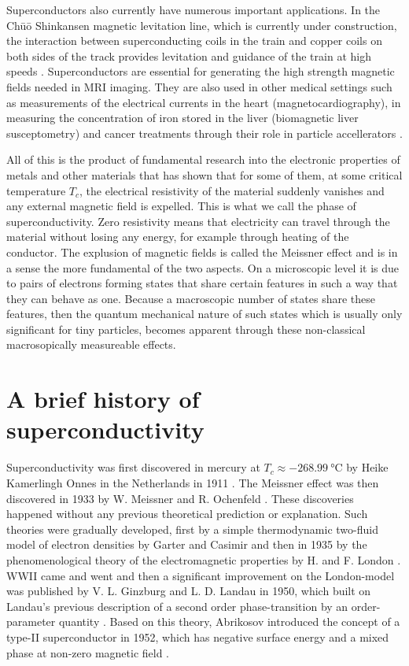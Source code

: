 Superconductors also currently have numerous important applications. In the Ch\=u\=o Shinkansen magnetic levitation line, which is currently
under construction, the interaction between superconducting coils in the train and copper coils on both sides of the track provides levitation and
guidance of the train at high speeds \cite{Bernstein20}. Superconductors are essential for generating the high strength magnetic fields needed
in MRI imaging. They are also used in other medical settings such as measurements of the electrical currents in the heart (magnetocardiography),
in measuring the concentration of iron stored in the liver (biomagnetic liver susceptometry) and cancer treatments through their role in 
particle accellerators \cite{Alonso12}.

All of this is the product of fundamental research into the electronic properties of metals and other materials that has shown that for some
of them, at some critical temperature $T_c$, the electrical resistivity of the material suddenly vanishes and any external magnetic field is expelled. This
is what we call the phase of superconductivity. Zero resistivity means that electricity can travel through the material without losing any energy, for
example through heating of the conductor. The explusion of magnetic fields is called the Meissner effect and is in a sense the more fundamental
of the two aspects. On a microscopic level it is due to pairs of electrons forming states that share certain features in such a way that they
can behave as one. Because a macroscopic number of states share these features, then the quantum mechanical nature of such states which is usually
only significant for tiny particles, becomes apparent through these non-classical macrosopically measureable effects.


\section{A brief history of superconductivity}

Superconductivity was first discovered in mercury at $T_c\approx\SI{-268.99}{\degreeCelsius}$ by Heike Kamerlingh Onnes in the Netherlands in 1911 \cite{Onnes}.
The Meissner effect was then discovered in 1933 by W. Meissner and R. Ochenfeld \cite{Meissner33}. These discoveries happened without any previous
theoretical prediction or explanation. Such theories were gradually developed, first by a simple thermodynamic two-fluid model of electron densities
by Garter and Casimir and then in 1935 by the phenomenological theory of the electromagnetic properties by H. and F. London \cite{London35}. WWII
came and went and then a significant improvement on the London-model was published by V. L. Ginzburg and L. D. Landau in 1950, which built on Landau's
previous description of a second order phase-transition by an order-parameter quantity \cite{Ginzburg50}. Based on this theory, Abrikosov introduced
the concept of a type-II superconductor in 1952, which has negative surface energy and a mixed phase at non-zero magnetic field \cite{Abrikosov52}.

